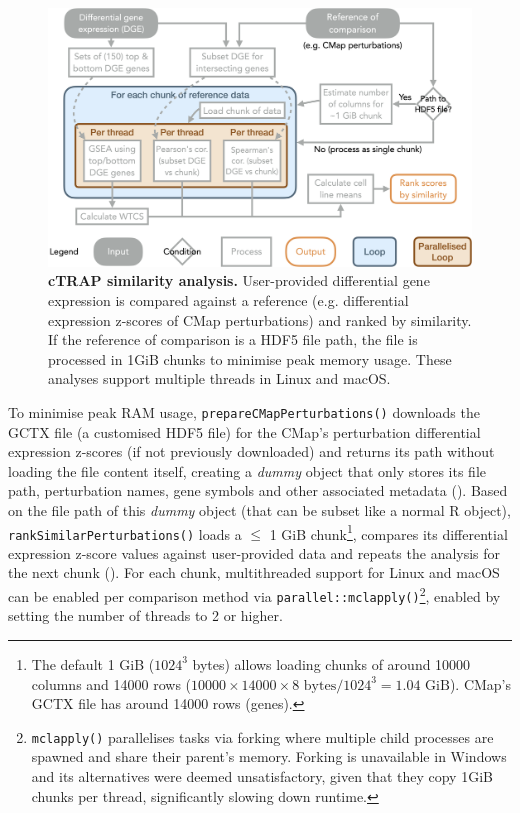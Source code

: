 \begin{figure}[!ht]
  \includegraphics[width=.8\textwidth]{images/ctrap/analysis}
  \centering
  \caption[cTRAP similarity analysis]{\textbf{cTRAP similarity analysis.} User-provided differential gene expression is compared against a reference (e.g. differential expression z-scores of CMap perturbations) and ranked by similarity. If the reference of comparison is a HDF5 file path, the file is processed in 1GiB chunks to minimise peak memory usage. These analyses support multiple threads in Linux and macOS.}
  \label{fig:ctrap-analyses}
\end{figure}

To minimise peak RAM usage, \texttt{prepareCMapPerturbations()} downloads the GCTX file (a customised HDF5 file) for the CMap’s perturbation differential expression z-scores (if not previously downloaded) and returns its path without loading the file content itself, creating a \emph{dummy} object that only stores its file path, perturbation names, gene symbols and other associated metadata (). Based on the file path of this \emph{dummy} object (that can be subset like a normal R object), \texttt{rankSimilarPerturbations()} loads a $\le$ 1 GiB chunk\footnote{The default 1 GiB ($1024^3$ bytes) allows loading chunks of around 10000 columns and 14000 rows ($10000 \times 14000 \times 8 \textrm{ bytes} / 1024^3 = 1.04 \textrm{ GiB}$). CMap's GCTX file has around 14000 rows (genes).}, compares its differential expression z-score values against user-provided data and repeats the analysis for the next chunk (). For each chunk, multithreaded support for Linux and macOS can be enabled per comparison method via \texttt{parallel::mclapply()}\footnote{\texttt{mclapply()} parallelises tasks via forking where multiple child processes are spawned and share their parent's memory. Forking is unavailable in Windows and its alternatives were deemed unsatisfactory, given that they copy 1GiB chunks per thread, significantly slowing down runtime.}, enabled by setting the number of threads to 2 or higher.

